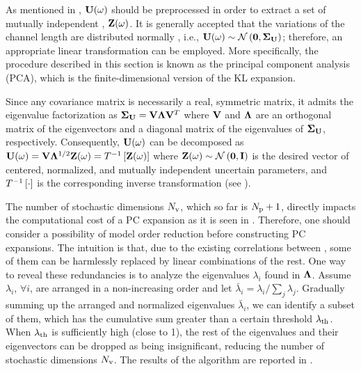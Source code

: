 As mentioned in , $\mathbf{U}(\omega)$ should be preprocessed in order to extract a set of mutually independent \rvs, $\mathbf{Z}(\omega)$. It is generally accepted that the variations of the channel length are distributed normally \cite{juan2011, juan2012, srivastava2010}, i.e., $\vU(\o) \sim \normal{\vZero}{\mCov_\vU}$; therefore, an appropriate linear transformation can be employed. More specifically, the procedure described in this section is known as the principal component analysis (PCA), which is the finite-dimensional version of the KL expansion.

Since any covariance matrix is necessarily a real, symmetric matrix, it admits the eigenvalue factorization \cite{press2007} as $\mCov_\vU = \m{V} \m{\Lambda} \m{V}^T$ where $\m{V}$ and $\m{\Lambda}$ are an orthogonal matrix of the eigenvectors and a diagonal matrix of the eigenvalues of $\mCov_\vU$, respectively. Consequently, $\mathbf{U}(\omega)$ can be decomposed as $\vU(\o) = \m{V} \m{\Lambda}^\ifrac{1}{2} \vZ(\o) = \oInvTransform{\vZ(\o)}$ where $\vZ(\o) \sim \normal{\vZero}{\mI}$ is the desired vector of centered, normalized, and mutually independent uncertain parameters, and $T^{-1}\left[\cdot\right]$ is the corresponding inverse transformation (see ).

The number of stochastic dimensions ${N_\text{v}}$, which so far is ${N_\text{p}} + 1$, directly impacts the computational cost of a PC expansion as it is seen in . Therefore, one should consider a possibility of model order reduction before constructing PC expansions. The intuition is that, due to the existing correlations between \rvs, some of them can be harmlessly replaced by linear combinations of the rest. One way to reveal these redundancies is to analyze the eigenvalues $\lambda_i$ found in $\m{\Lambda}$. Assume $\lambda_i$, $\forall i$, are arranged in a non-increasing order and let $\bar{\lambda}_i = \lambda_i / \sum_j \lambda_j$. Gradually summing up the arranged and normalized eigenvalues $\bar{\lambda}_i$, we can identify a subset of them, which has the cumulative sum greater than a certain threshold $\lambda_\text{th}$. When $\lambda_\text{th}$ is sufficiently high (close to 1), the rest of the eigenvalues and their eigenvectors can be dropped as being insignificant, reducing the number of stochastic dimensions ${N_\text{v}}$. The results of the algorithm are reported in .
